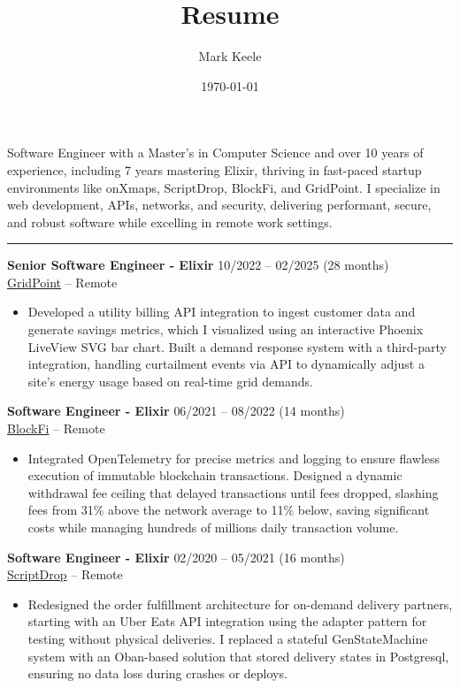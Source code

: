 \documentclass[12pt,letterpaper]{article}
\author{Mark Keele}
\title{Resume}
\date{\today}
\begin{document}
Software Engineer with a Master’s in Computer Science and over 10 years of experience, including 7 years mastering Elixir, thriving in fast-paced startup environments like onXmaps, ScriptDrop, BlockFi, and GridPoint. I specialize in web development, APIs, networks, and security, delivering performant, secure, and robust software while excelling in remote work settings.

\noindent\rule{7.5in}{0.4pt}

\noindent\textbf{Senior Software Engineer - Elixir}
\hfill{10/2022 -- 02/2025 (28 months)} \\
\href{https://www.gridpoint.com/}{GridPoint} -- Remote

\begin{itemize}

  \item Developed a utility billing API integration to ingest customer data and generate savings metrics, which I visualized using an interactive Phoenix LiveView SVG bar chart. Built a demand response system with a third-party integration, handling curtailment events via API to dynamically adjust a site's energy usage based on real-time grid demands.

\end{itemize}

\noindent\textbf{Software Engineer - Elixir}
\hfill{06/2021 -- 08/2022 (14 months)} \\
\href{https://blockfi.com/}{BlockFi} -- Remote

\begin{itemize}

  \item Integrated OpenTelemetry for precise metrics and logging to ensure flawless execution of immutable blockchain transactions. Designed a dynamic withdrawal fee ceiling that delayed transactions until fees dropped, slashing fees from 31\% above the network average to 11\% below, saving significant costs while managing hundreds of millions daily transaction volume.

\end{itemize}

\noindent\textbf{Software Engineer - Elixir}
\hfill{02/2020 -- 05/2021 (16 months)} \\
\href{https://scriptdrop.co/}{ScriptDrop} -- Remote

\begin{itemize}

  \item Redesigned the order fulfillment architecture for on-demand delivery partners, starting with an Uber Eats API integration using the adapter pattern for testing without physical deliveries. I replaced a stateful GenStateMachine system with an Oban-based solution that stored delivery states in Postgresql, ensuring no data loss during crashes or deploys.

\end{itemize}
\end{document}
